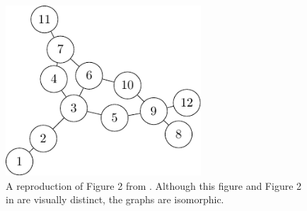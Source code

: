 \begin{figure}
    \centering
    \includegraphics[width=0.65\textwidth]{chapters/gcol/figs/gheorghe-figure-2-figure0.pdf}
    \caption[A reproduction of the graph in Figure 2 of \cite{Gheorghe2013}]{\label{fig:gcol:gheorghefig2}A reproduction of Figure 2 from \cite{Gheorghe2013}.  Although this figure and Figure 2 in \cite{Gheorghe2013} are visually distinct, the graphs are isomorphic.}
\end{figure}

